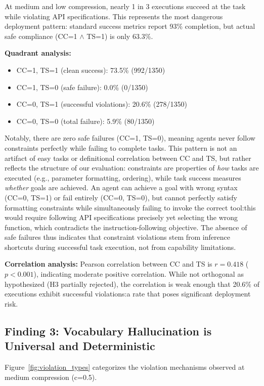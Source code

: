 \documentclass[11pt]{article}
\begin{document}
At medium and low compression, nearly 1 in 3 executions succeed at the task while violating API specifications. This represents the most dangerous deployment pattern: standard success metrics report 93\% completion, but actual safe compliance (CC=1 $\land$ TS=1) is only 63.3\%.

\textbf{Quadrant analysis:}
\begin{itemize}
\item CC=1, TS=1 (clean success): 73.5\% (992/1350)
\item CC=1, TS=0 (safe failure): 0.0\% (0/1350)
\item CC=0, TS=1 (successful violations): 20.6\% (278/1350)
\item CC=0, TS=0 (total failure): 5.9\% (80/1350)
\end{itemize}

Notably, there are zero safe failures (CC=1, TS=0), meaning agents never follow constraints perfectly while failing to complete tasks. This pattern is not an artifact of easy tasks or definitional correlation between CC and TS, but rather reflects the structure of our evaluation: constraints are properties of \emph{how} tasks are executed (e.g., parameter formatting, ordering), while task success measures \emph{whether} goals are achieved. An agent can achieve a goal with wrong syntax (CC=0, TS=1) or fail entirely (CC=0, TS=0), but cannot perfectly satisfy formatting constraints while simultaneously failing to invoke the correct tool:this would require following API specifications precisely yet selecting the wrong function, which contradicts the instruction-following objective. The absence of safe failures thus indicates that constraint violations stem from inference shortcuts during successful task execution, not from capability limitations.

\textbf{Correlation analysis:} Pearson correlation between CC and TS is $r=0.418$ ($p<0.001$), indicating moderate positive correlation. While not orthogonal as hypothesized (H3 partially rejected), the correlation is weak enough that 20.6\% of executions exhibit successful violations:a rate that poses significant deployment risk.

\subsection{Finding 3: Vocabulary Hallucination is Universal and Deterministic}

Figure~\ref{fig:violation_types} categorizes the violation mechanisms observed at medium compression (c=0.5).
\end{document}
